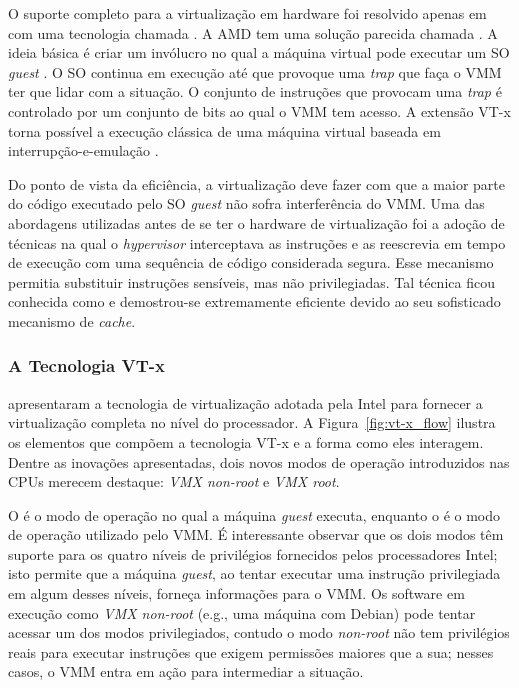 O suporte completo para a virtualização em hardware foi resolvido apenas em
 \citep{uhlig} com uma tecnologia chamada
. A AMD tem uma solução parecida
chamada . A ideia básica é criar um
invólucro no qual a máquina virtual pode executar um SO \emph{guest} . O SO continua em execução até que provoque uma \emph{trap} que
faça o VMM ter que lidar com a situação. O conjunto de instruções que
provocam uma \emph{trap} é controlado por um conjunto de bits ao qual o VMM
tem acesso. A extensão VT-x torna possível a execução clássica de uma máquina
virtual baseada em interrupção-e-emulação \citep{tanenbaum}.

Do ponto de vista da eficiência, a virtualização deve fazer com que a maior
parte do código executado pelo SO \emph{guest} não sofra interferência do VMM.
Uma das abordagens utilizadas antes de se ter o hardware de virtualização foi a
adoção de técnicas na qual o \textit{hypervisor} interceptava as instruções e
as reescrevia em tempo de execução com uma sequência de código considerada
segura. Esse mecanismo permitia substituir instruções sensíveis, mas não
privilegiadas. Tal técnica ficou conhecida como 
e demostrou-se extremamente eficiente devido ao seu sofisticado mecanismo de
\emph{cache}.


\subsubsection{A Tecnologia VT-x}
\label{sec:vtx}

\cite{uhlig} apresentaram a tecnologia de virtualização adotada pela Intel para
fornecer a virtualização completa no nível do processador. A
Figura~\ref{fig:vt-x_flow} ilustra os elementos que compõem a tecnologia VT-x e a
forma como eles interagem. Dentre as inovações apresentadas, dois novos modos
de operação introduzidos nas CPUs merecem destaque: \emph{VMX non-root} e
\emph{VMX root}.

O  é o modo de operação no qual a máquina
\emph{guest} executa, enquanto o  é o modo de operação utilizado
pelo VMM. É interessante observar que os dois modos têm suporte para os quatro
níveis de privilégios fornecidos pelos processadores Intel; isto permite que a
máquina \emph{guest}, ao tentar executar uma instrução privilegiada em algum
desses níveis, forneça informações para o VMM. Os software em execução como
\emph{VMX non-root} (e.g., uma máquina com Debian) pode tentar acessar um dos
modos privilegiados, contudo o modo \emph{non-root} não tem privilégios reais
para executar instruções que exigem permissões maiores que a sua; nesses casos,
o VMM entra em ação para intermediar a situação.

